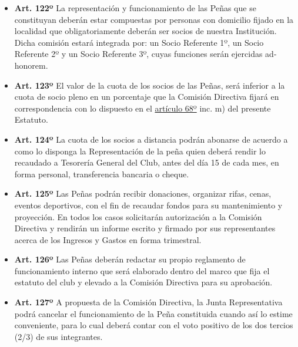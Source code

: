 \documentclass[openany]{book}
\providecommand{\tightlist}{%
  \setlength{\itemsep}{0pt}\setlength{\parskip}{0pt}}
\begin{document}
\begin{itemize}
\tightlist
\item
  \textbf{Art. 122º}
  La representación y funcionamiento de las Peñas que se constituyan deberán estar compuestas por personas con domicilio fijado en la localidad que obligatoriamente deberán ser socios de nuestra Institución. Dicha comisión estará integrada por: un Socio Referente 1º, un Socio Referente 2º y un Socio Referente 3º, cuyas funciones serán ejercidas ad-honorem.
\end{itemize}

\begin{itemize}
\tightlist
\item
  \textbf{Art. 123º}
  El valor de la cuota de los socios de las Peñas, será inferior a la cuota de socio pleno en un porcentaje que la Comisión Directiva fijará en correspondencia con lo dispuesto en el \protect\hyperlink{art68}{artículo 68º} inc. m) del presente Estatuto.
\end{itemize}

\begin{itemize}
\tightlist
\item
  \textbf{Art. 124º}
  La cuota de los socios a distancia podrán abonarse de acuerdo a como lo disponga la Representación de la peña quien deberá rendir lo recaudado a Tesorería General del Club, antes del día 15 de cada mes, en forma personal, transferencia bancaria o cheque.
\end{itemize}

\begin{itemize}
\tightlist
\item
  \textbf{Art. 125º}
  Las Peñas podrán recibir donaciones, organizar rifas, cenas, eventos deportivos, con el fin de recaudar fondos para su mantenimiento y proyección. En todos los casos solicitarán autorización a la Comisión Directiva y rendirán un informe escrito y firmado por sus representantes acerca de los Ingresos y Gastos en forma trimestral.
\end{itemize}

\begin{itemize}
\tightlist
\item
  \textbf{Art. 126º}
  Las Peñas deberán redactar su propio reglamento de funcionamiento interno que será elaborado dentro del marco que fija el estatuto del club y elevado a la Comisión Directiva para su aprobación.
\end{itemize}

\begin{itemize}
\tightlist
\item
  \textbf{Art. 127º}
  A propuesta de la Comisión Directiva, la Junta Representativa podrá cancelar el funcionamiento de la Peña constituida cuando así lo estime conveniente, para lo cual deberá contar con el voto positivo de los dos tercios (2/3) de sus integrantes.
\end{itemize}
\end{document}
